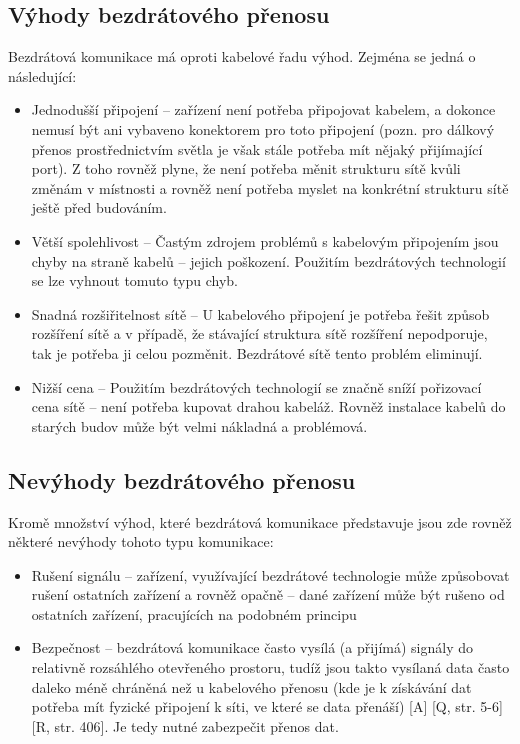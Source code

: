 \subsection*{Výhody bezdrátového přenosu}
Bezdrátová komunikace má oproti kabelové řadu výhod. Zejména se jedná o následující:

\begin{itemize}
    \item Jednodušší připojení – zařízení není potřeba připojovat kabelem, a dokonce nemusí být ani vybaveno konektorem pro toto připojení (pozn. pro dálkový přenos prostřednictvím světla je však stále potřeba mít nějaký přijímající port). Z toho rovněž plyne, že není potřeba měnit strukturu sítě kvůli změnám v místnosti a rovněž není potřeba myslet na konkrétní strukturu sítě ještě před budováním.
    \item Větší spolehlivost – Častým zdrojem problémů s kabelovým připojením jsou chyby na straně kabelů – jejich poškození. Použitím bezdrátových technologií se lze vyhnout tomuto typu chyb.
    \item Snadná rozšiřitelnost sítě – U kabelového připojení je potřeba řešit způsob rozšíření sítě a v případě, že stávající struktura sítě rozšíření nepodporuje, tak je potřeba ji celou pozměnit. Bezdrátové sítě tento problém eliminují.
    \item Nižší cena – Použitím bezdrátových technologií se značně sníží pořizovací cena sítě – není potřeba kupovat drahou kabeláž. Rovněž instalace kabelů do starých budov může být velmi nákladná a problémová.
\end{itemize}

\subsection*{Nevýhody bezdrátového přenosu}
Kromě množství výhod, které bezdrátová komunikace představuje jsou zde rovněž některé nevýhody tohoto typu komunikace:

\begin{itemize}
    \item Rušení signálu – zařízení, využívající bezdrátové technologie může způsobovat rušení ostatních zařízení a rovněž opačně – dané zařízení může být rušeno od ostatních zařízení, pracujících na podobném principu
    \item Bezpečnost – bezdrátová komunikace často vysílá (a přijímá) signály do relativně rozsáhlého otevřeného prostoru, tudíž jsou takto vysílaná data často daleko méně chráněná než u kabelového přenosu (kde je k získávání dat potřeba mít fyzické připojení k síti, ve které se data přenáší) [A] [Q, str. 5-6] [R, str. 406]. Je tedy nutné zabezpečit přenos dat.
\end{itemize}



